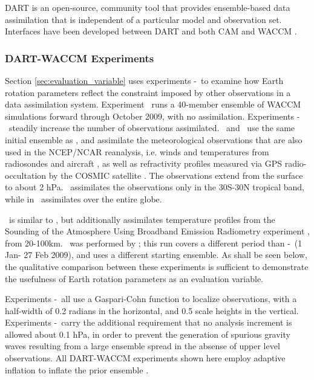 DART \citep{Anderson2009} is an open-source, community tool that provides ensemble-based data assimilation that is independent of a particular model and observation set.
Interfaces have been developed between DART and both CAM \citep{Raeder2012} and WACCM \citep{Pedatella2013}.

\subsubsection{DART-WACCM Experiments}
Section \ref{sec:evaluation_variable} uses experiments \WACCMNODA-\NCARFULL~to examine how Earth rotation parameters reflect the constraint imposed by other observations in a data assimilation system.  
Experiment \WACCMNODA~runs a 40-member ensemble of WACCM simulations forward through October 2009, with no assimilation. 
Experiments \WACCMTROPICS-\NCARFULL~steadily increase the number of observations assimilated. 
\WACCMTROPICS~and \WACCMGLOBAL~use the same initial ensemble as \WACCMNODA, and assimilate the meteorological observations that are also used in the NCEP/NCAR reanalysis, i.e. winds and temperatures from radiosondes and aircraft \citep{Saha2010}, as well as refractivity profiles measured via GPS radio-occultation by the COSMIC satellite \citep{Anthes2008}.
The observations extend from the surface to about 2 hPa. 
\WACCMTROPICS~assimilates the observations only in the 30S-30N tropical band, while in \WACCMGLOBAL~assimilates over the entire globe.

\NCARFULL ~is similar to \WACCMGLOBAL, but additionally assimilates temperature profiles from the Sounding of the Atmosphere Using Broadband Emission Radiometry experiment \citep[SABER]{Russell2009}, from 20-100km.
\NCARFULL ~was performed by \citet{Pedatella2014}; this run covers a different period than \WACCMNODA-\WACCMTROPICS ~(1 Jan- 27 Feb 2009), and uses a different starting ensemble.  
As shall be seen below, the qualitative comparison between these experiments is sufficient to demonstrate the usefulness of Earth rotation parameters as an evaluation variable. 

Experiments \WACCMNODA-\NCARFULL~all use a Gaspari-Cohn function \citep{Gaspari1999} to localize observations, with a half-width of 0.2 radians in the horizontal, and 0.5 scale heights in the vertical.  
Experiments \WACCMNODA-\WACCMGLOBAL~carry the additional requirement that no analysis increment is allowed about 0.1 hPa, in order to prevent the generation of spurious gravity waves resulting from a large ensemble spread in the absense of upper level observations. 
All DART-WACCM experiments shown here employ adaptive inflation to inflate the prior ensemble \citep{Anderson2009}.  


